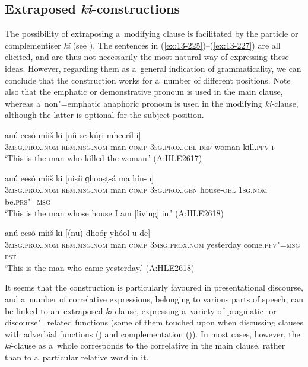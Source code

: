 \subsection{Extraposed \textit{ki}-constructions}
\label{subsec:13-6-7}

The possibility of extraposing a~modifying clause is facilitated by the particle or complementiser \textit{ki} (see ). The sentences in (\ref{ex:13-225})--(\ref{ex:13-227}) are all elicited, and are thus not necessarily the most natural way of expressing these ideas. However, regarding them as a~general indication of grammaticality, we can conclude that the construction works for a~number of different positions. Note also that the emphatic or demonstrative pronoun is used in the main clause, whereas a~non"=emphatic anaphoric pronoun is used in the modifying \textit{ki-}clause, although the latter is optional for the subject position.

\begin{exe}
\ex
\label{ex:13-225}
\gll anú eesó míiš ki [níi  se kúṛi mheeríl-i] \\
\textsc{3msg.prox.nom} \textsc{rem.msg.nom} man \textsc{comp} \textsc{3sg.prox.obl} \textsc{def} woman kill.\textsc{pfv-f} \\
\glt `This is the man who killed the woman.' (A:HLE2617)

\ex
\label{ex:13-226}
\gll anú eesó míiš ki [nisíi  ɡhooṣṭ-á ma hín-u] \\
\textsc{3msg.prox.nom} \textsc{rem.msg.nom} man \textsc{comp} \textsc{3sg.prox.gen} house-\textsc{obl} \textsc{1sg.nom} be.\textsc{prs"=msg} \\
\glt `This is the man whose house I am [living] in.' (A:HLE2618)

\ex
\label{ex:13-227}
\gll anú eesó míiš ki [(nu)  dhoóṛ yhóol-u de] \\
\textsc{3msg.prox.nom} \textsc{rem.msg.nom} man \textsc{comp} \textsc{3msg.prox.nom} yesterday come.\textsc{pfv"=msg} \textsc{pst} \\
\glt `This is the man who came yesterday.' (A:HLE2618) 
\end{exe}

It seems that the construction is particularly favoured in presentational discourse, and a~number of correlative expressions, belonging to various parts of speech, can be linked to an~extraposed \textit{ki}-clause, expressing a~variety of pragmatic- or discourse"=related functions (some of them touched upon when discussing clauses with adverbial functions () and complementation ()). In most cases, however, the \textit{ki}-clause as a~whole corresponds to the correlative in the main clause, rather than to a~particular relative word in it.

